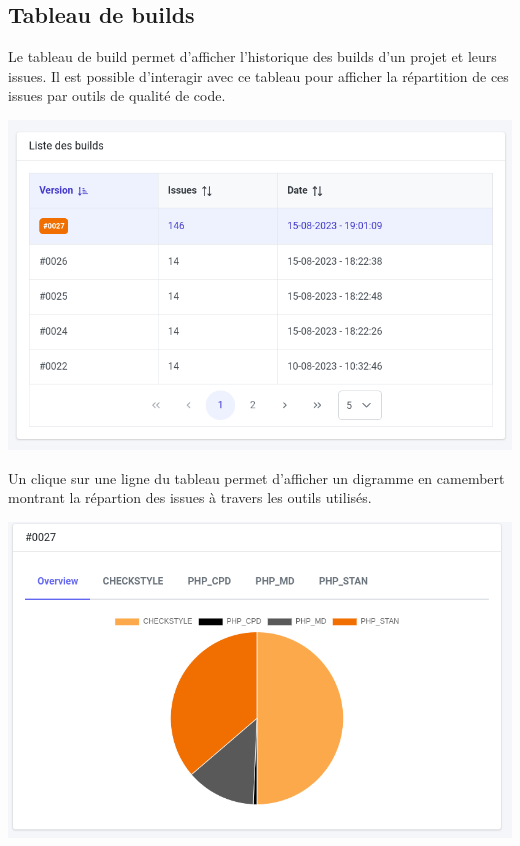 		\subsection{Tableau de builds}
		Le tableau de build permet d'afficher l'historique des builds d'un projet et leurs issues. Il est possible d'interagir avec ce tableau pour afficher la répartition de ces issues par outils de qualité de code.\\
		\begin{center}
			\includegraphics[scale=0.5]{chap_4/tableau-builds.png}
			\label{Tableau - builds}
		\end{center}
		Un clique sur une ligne du tableau permet d'afficher un digramme en camembert montrant la répartion des issues à travers les outils utilisés.
		\begin{center}
			\includegraphics[scale=0.5]{chap_4/repartion-outils.png}
			\label{Repartition - outils}
		\end{center}